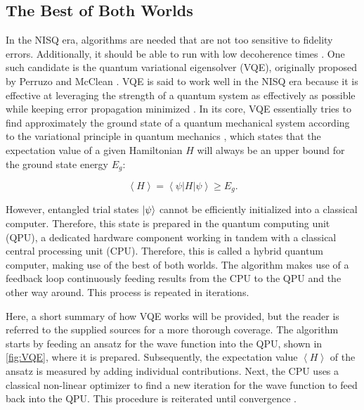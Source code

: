 \subsection{The Best of Both Worlds}

In the NISQ era, algorithms are needed that are not too sensitive to fidelity errors. Additionally, it should be able to run with low decoherence times \cite{McClean2016}. One such candidate is the quantum variational eigensolver (VQE), originally proposed by Perruzo and McClean \cite{Peruzzo2014}. VQE is said to work well in the NISQ era because it is effective at leveraging the strength of a quantum system as effectively as possible while keeping error propagation minimized \cite{McClean2016}. In its core, VQE essentially tries to find approximately the ground state of a quantum mechanical system according to the variational principle in quantum mechanics \cite{Griffiths2004}, which states that the expectation value of a given Hamiltonian $H$ will always be an upper bound for the ground state energy $E_g$:

\begin{equation}
	\left\langle H \right\rangle = \left\langle \psi | H | \psi \right\rangle \geq E_g.
\end{equation}

However, entangled trial states $\lvert\psi\rangle$ cannot be efficiently initialized into a classical computer. Therefore, this state is prepared in the quantum computing unit (QPU), a dedicated hardware component working in tandem with a classical central processing unit (CPU). Therefore, this is called a hybrid quantum computer, making use of the best of both worlds. The algorithm makes use of a feedback loop continuously feeding results from the CPU to the QPU and the other way around. This process is repeated in iterations.

Here, a short summary of how VQE works will be provided, but the reader is referred to the supplied sources for a more thorough coverage. The algorithm starts by feeding an ansatz for the wave function into the QPU, shown in \cref{fig:VQE}, where it is prepared. Subsequently, the expectation value $\left\langle H\right\rangle$ of the ansatz is measured by adding individual contributions. Next, the CPU uses a classical non-linear optimizer to find a new iteration for the wave function to feed back into the QPU. This procedure is reiterated until convergence \cite{McClean2016,Peruzzo2014,Keijzer2021}.

